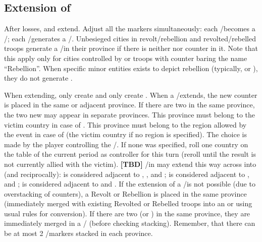 \subsection{Extension of \REVOLT}
\label{chRedep:Extension Revolts}
 After \STAB losses, \REVOLT and \REBELLION extend. Adjust
all the markers simultaneously:
\bparag each \REVOLT/\REBELLION\facemoins becomes a
\REVOLT/\REBELLION\faceplus;
\bparag each \REVOLT/\REBELLION\faceplus generates a
\REVOLT/\REBELLION\facemoins.
\bparag Unbesieged cities in revolt/rebellion and revolted/rebelled troops
generate a \REVOLT/\REBELLION\facemoins in their province if there is neither
\REVOLT nor \REBELLION counter in it.
\bparag Note that this apply only for cities controlled by or troops with
counter baring the name ``Rebellion''. When specific minor entities exists to
depict rebellion (typically,  or ), they do
not generate \REBELLION.

\bparag When extending, \REVOLT only create \REVOLT and \REBELLION only create
\REBELLION.
\bparag When a \REVOLT/\REBELLION\Faceplus extends, the new counter is placed
in the same or adjacent province. If there are two \REVOLT\Faceplus in the
same province, the two new \REVOLT\Facemoins may appear in separate
provinces.
\bparag This province must belong to the victim country in case of \REVOLT.
\bparag This province must belong to the region allowed by the event in case
of \REBELLION (the victim country if no region is specified).
\bparag The choice is made by the player controlling the
\REVOLT/\REBELLION. If none was specified, roll one country on the \REVOLT
table of the current period as controller for this turn (reroll until the
result is not currently allied with the victim).
\bparag \textbf{[TBD]} \REVOLT/\REBELLION in \regionIrlande may extend this
way across \seazoneIrlande into \ANG (and reciprocally): \provinceUlster is
considered adjacent to \provinceAlba, \provinceAyr, \provinceGalloway and
\provinceCumberland ; \provinceBrega is considered adjacent to
\provinceCumberland, \provinceLancashire and \provinceCymru ;
\provinceLeinster is considered adjacent to \provinceCymru and
\provinceCornwall.
\bparag If the extension of a \REVOLT/\REBELLION\faceplus is not possible (due
to overstacking of counters), a Revolt or Rebellion \LD is placed in the same
province (immediately merged with existing Revolted or Rebelled troops into an
\ARMY\Facemoins or \ARMY\Faceplus using usual rules for conversion).
\bparag If there are two \REVOLT\Facemoins (or \REBELLION\Facemoins) in the
same province, they are immediately merged in a \REVOLT/\REBELLION\Faceplus
(before checking stacking).
\bparag Remember, that there can be at most 2 \REVOLT/\REBELLION markers
stacked in each province.

